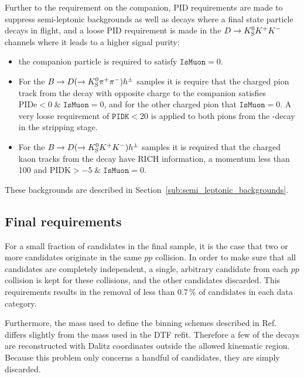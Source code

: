 Further to the requirement on the companion, PID requirements are made to suppress semi-leptonic backgrounds as well as decays where a final state particle decays in flight, and a loose PID requirement is made in the ${D}\rightarrow{\ensuremath{{K}^0_{\mathrm{S}}}}{\ensuremath{{K}^+}}{\ensuremath{{K}^-}}$ channels where it leads to a higher signal purity:
\begin{itemize}
    \item the companion particle is required to satisfy $\texttt{IsMuon}=0$.
    \item For the ${B}\rightarrow{\ensuremath{D}}(\rightarrow{\ensuremath{{K}^0_{\mathrm{S}}}}{\ensuremath{{\pi}^+}}{\ensuremath{{\pi}^-}})h^{\pm}$ samples it is require that the charged pion track from the \D decay with opposite charge to the companion satisfies ${\textrm{PIDe} < 0 \;\&\; \texttt{IsMuon}=0}$, and for the other charged pion that ${\texttt{IsMuon}=0}$. A very loose requirement of $\texttt{PIDK} < 20$ is applied to both pions from the \D-decay in the stripping stage.
    \item For the ${B}\rightarrow{\ensuremath{D}}(\rightarrow{\ensuremath{{K}^0_{\mathrm{S}}}}{\ensuremath{{K}^+}}{\ensuremath{{K}^-}})h^{\pm}$ samples it is required that the charged kaon tracks from the \D decay have RICH information, a momentum less than 100 \gevc and ${\textrm{PIDK} > -5 \;\&\; \texttt{IsMuon}=0}$.
\end{itemize}
These backgrounds are described in Section~\ref{sub:semi_leptonic_backgrounds}.



\subsection{Final requirements} %
\label{sub:final_requirements}

For a small fraction of candidates in the final sample, it is the case that two or more candidates originate in the same $pp$ collision. In order to make sure that all candidates are completely independent, a single, arbitrary candidate from each $pp$ collision is kept for these collisions, and the other candidates discarded. This requirements results in the removal of less than 0.7\,\% of candidates in each data category.

Furthermore, the \D mass used to define the binning schemes described in Ref.~\cite{CLEOCISI} differs slightly from the mass used in the DTF refit. Therefore a few of the decays are reconstructed with Dalitz coordinates outside the allowed kinematic region. Because this problem only concerns a handful of candidates, they are simply discarded.


